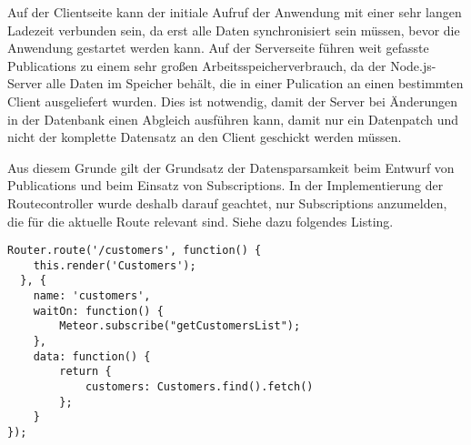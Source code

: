 Auf der Clientseite kann der initiale Aufruf der Anwendung mit einer sehr langen
Ladezeit verbunden sein, da erst alle Daten synchronisiert sein müssen, bevor
die Anwendung gestartet werden kann. Auf der Serverseite führen weit gefasste
Publications zu einem sehr großen Arbeitsspeicherverbrauch, da der
Node.js-Server alle Daten im Speicher behält, die in einer Pulication an einen
bestimmten Client ausgeliefert wurden. Dies ist notwendig, damit der Server bei
Änderungen in der Datenbank einen Abgleich ausführen kann, damit nur ein
Datenpatch und nicht der komplette Datensatz an den Client geschickt werden
müssen.

Aus diesem Grunde gilt der Grundsatz der Datensparsamkeit beim Entwurf von
Publications und beim Einsatz von Subscriptions. In der Implementierung der
Routecontroller wurde deshalb darauf geachtet, nur Subscriptions anzumelden, die
für die aktuelle Route relevant sind. Siehe dazu folgendes Listing.

\begin{lstlisting}[caption=Auszug aus Routecontroller für Route 'customers']
Router.route('/customers', function() {
  	this.render('Customers');
  }, {
  	name: 'customers',
  	waitOn: function() {
  		Meteor.subscribe("getCustomersList");
  	},
  	data: function() {
  		return {
  			customers: Customers.find().fetch()
  		};
  	}
});
\end{lstlisting}
